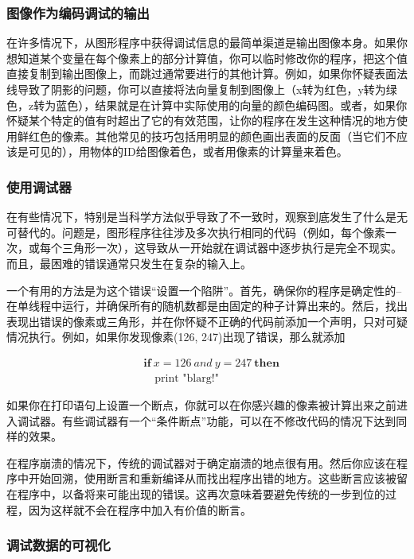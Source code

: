 \documentclass[lang=cn,12pt]{elegantbook}
\begin{document}
\subsubsection{图像作为编码调试的输出}

在许多情况下，从图形程序中获得调试信息的最简单渠道是输出图像本身。如果你想知道某个变量在每个像素上的部分计算值，你可以临时修改你的程序，把这个值直接复制到输出图像上，而跳过通常要进行的其他计算。例如，如果你怀疑表面法线导致了阴影的问题，你可以直接将法向量复制到图像上（x转为红色，y转为绿色，z转为蓝色），结果就是在计算中实际使用的向量的颜色编码图。或者，如果你怀疑某个特定的值有时超出了它的有效范围，让你的程序在发生这种情况的地方使用鲜红色的像素。其他常见的技巧包括用明显的颜色画出表面的反面（当它们不应该是可见的），用物体的ID给图像着色，或者用像素的计算量来着色。

\subsubsection{使用调试器}

在有些情况下，特别是当科学方法似乎导致了不一致时，观察到底发生了什么是无可替代的。问题是，图形程序往往涉及多次执行相同的代码（例如，每个像素一次，或每个三角形一次），这导致从一开始就在调试器中逐步执行是完全不现实。而且，最困难的错误通常只发生在复杂的输入上。

一个有用的方法是为这个错误“设置一个陷阱”。首先，确保你的程序是确定性的--在单线程中运行，并确保所有的随机数都是由固定的种子计算出来的。然后，找出表现出错误的像素或三角形，并在你怀疑不正确的代码前添加一个声明，只对可疑情况执行。例如，如果你发现像素(126, 247)出现了错误，那么就添加


\[
  \begin{aligned}
  &\textbf{if}\ x=126 \ and\ y=247 \ \textbf{then} \\ 
  &\quad \text{print\ "blarg!"}
  \end{aligned}
\]

如果你在打印语句上设置一个断点，你就可以在你感兴趣的像素被计算出来之前进入调试器。有些调试器有一个“条件断点”功能，可以在不修改代码的情况下达到同样的效果。

在程序崩溃的情况下，传统的调试器对于确定崩溃的地点很有用。然后你应该在程序中开始回溯，使用断言和重新编译从而找出程序出错的地方。这些断言应该被留在程序中，以备将来可能出现的错误。这再次意味着要避免传统的一步到位的过程，因为这样就不会在程序中加入有价值的断言。

\subsubsection{调试数据的可视化}
\end{document}
